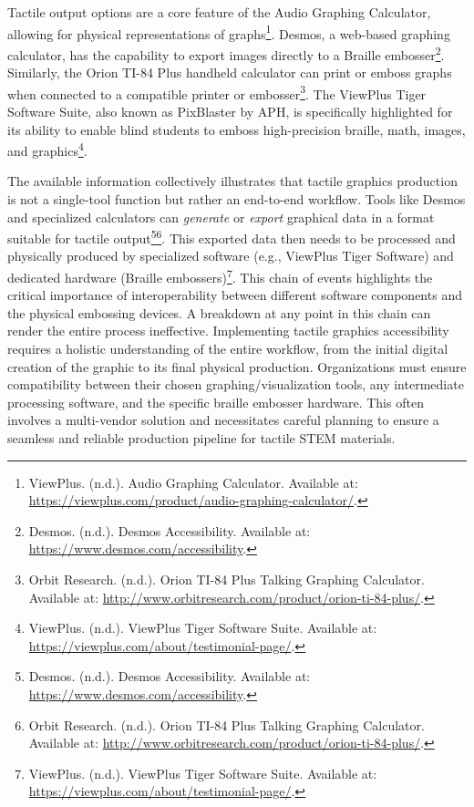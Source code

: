 Tactile output options are a core feature of the Audio Graphing Calculator, allowing for physical representations of graphs\footnote{ViewPlus. (n.d.). Audio Graphing Calculator. Available at: \url{https://viewplus.com/product/audio-graphing-calculator/}.}. Desmos, a web-based graphing calculator, has the capability to export images directly to a Braille embosser\footnote{Desmos. (n.d.). Desmos Accessibility. Available at: \url{https://www.desmos.com/accessibility}.}. Similarly, the Orion TI-84 Plus handheld calculator can print or emboss graphs when connected to a compatible printer or embosser\footnote{Orbit Research. (n.d.). Orion TI-84 Plus Talking Graphing Calculator. Available at: \url{http://www.orbitresearch.com/product/orion-ti-84-plus/}.}. The ViewPlus Tiger Software Suite, also known as PixBlaster by APH, is specifically highlighted for its ability to enable blind students to emboss high-precision braille, math, images, and graphics\footnote{ViewPlus. (n.d.). ViewPlus Tiger Software Suite. Available at: \url{https://viewplus.com/about/testimonial-page/}.}.

The available information collectively illustrates that tactile graphics production is not a single-tool function but rather an end-to-end workflow. Tools like Desmos and specialized calculators can \textit{generate} or \textit{export} graphical data in a format suitable for tactile output\footnote{Desmos. (n.d.). Desmos Accessibility. Available at: \url{https://www.desmos.com/accessibility}.}\footnote{Orbit Research. (n.d.). Orion TI-84 Plus Talking Graphing Calculator. Available at: \url{http://www.orbitresearch.com/product/orion-ti-84-plus/}.}. This exported data then needs to be processed and physically produced by specialized software (e.g., ViewPlus Tiger Software) and dedicated hardware (Braille embossers)\footnote{ViewPlus. (n.d.). ViewPlus Tiger Software Suite. Available at: \url{https://viewplus.com/about/testimonial-page/}.}. This chain of events highlights the critical importance of interoperability between different software components and the physical embossing devices. A breakdown at any point in this chain can render the entire process ineffective. Implementing tactile graphics accessibility requires a holistic understanding of the entire workflow, from the initial digital creation of the graphic to its final physical production. Organizations must ensure compatibility between their chosen graphing/visualization tools, any intermediate processing software, and the specific braille embosser hardware. This often involves a multi-vendor solution and necessitates careful planning to ensure a seamless and reliable production pipeline for tactile STEM materials.

